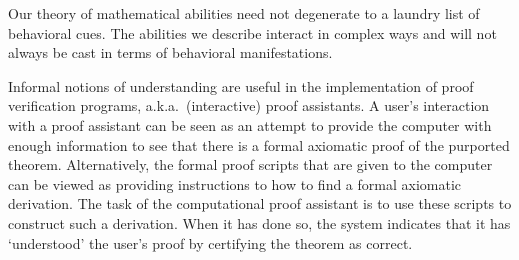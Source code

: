 \documentclass{article}
\begin{document}
Our theory of mathematical abilities need not degenerate to a laundry list of
behavioral cues. The abilities we describe interact in complex ways and will 
not always be cast in terms of behavioral manifestations.

Informal notions of understanding are useful in the implementation of proof
verification programs, a.k.a.~(interactive) proof assistants. 
A user's interaction with a proof assistant can be seen as an attempt to provide
the computer with enough information to see that there is a formal axiomatic
proof of the purported theorem. Alternatively, the formal proof scripts that
are given to the computer can be viewed as providing instructions to how to
find a formal axiomatic derivation. The task of the computational proof assistant
is to use these scripts to construct such a derivation. When it has done so,
the system indicates that it has `understood' the user's proof by certifying
the theorem as correct.
\end{document}
